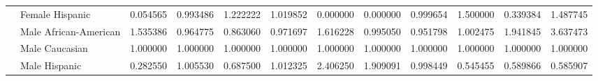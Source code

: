 \begin{tabular}{llrrrrrrrrrr}
    & Female Hispanic &       0.054565 &       0.993486 &       1.222222 &             1.019852 &       0.000000 &       0.000000 &         0.999654 &       1.500000 &       0.339384 &       1.487745 \\
    & Male African-American &       1.535386 &       0.964775 &       0.863060 &             0.971697 &       1.616228 &       0.995050 &         0.951798 &       1.002475 &       1.941845 &       3.637473 \\
    & Male Caucasian &       1.000000 &       1.000000 &       1.000000 &             1.000000 &       1.000000 &       1.000000 &         1.000000 &       1.000000 &       1.000000 &       1.000000 \\
    & Male Hispanic &       0.282550 &       1.005530 &       0.687500 &             1.012325 &       2.406250 &       1.909091 &         0.998449 &       0.545455 &       0.589866 &       0.585907 \\
\bottomrule
\end{tabular}

